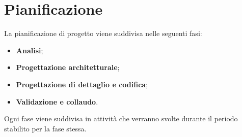 \section{Pianificazione}
La pianificazione di progetto viene suddivisa nelle seguenti fasi:
\begin{itemize}
	\item \textbf{Analisi};
	\item \textbf{Progettazione architetturale};
	\item \textbf{Progettazione di dettaglio e codifica};
	\item \textbf{Validazione e collaudo}.
\end{itemize}
Ogni fase viene suddivisa in attività che verranno svolte durante il periodo stabilito per la fase stessa.

\newpage

\newpage

\newpage
